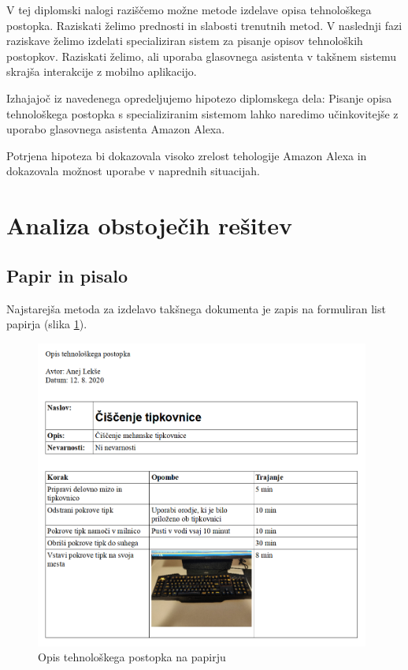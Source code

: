 \documentclass[a4paper, 12pt]{book}
\begin{document}
V tej diplomski nalogi raziščemo možne metode izdelave opisa tehnološkega postopka.
Raziskati želimo prednosti in slabosti trenutnih metod.
V naslednji fazi raziskave želimo izdelati specializiran sistem za pisanje opisov tehnoloških postopkov.
Raziskati želimo, ali uporaba glasovnega asistenta v takšnem sistemu skrajša interakcije z mobilno aplikacijo.

Izhajajoč iz navedenega opredeljujemo hipotezo diplomskega dela: Pisanje opisa tehnološkega postopka s specializiranim sistemom lahko naredimo učinkovitejše z uporabo glasovnega asistenta Amazon Alexa.

Potrjena hipoteza bi dokazovala visoko zrelost tehologije Amazon Alexa in dokazovala možnost uporabe v naprednih situacijah.

\section{Analiza obstoječih rešitev}

\subsection{Papir in pisalo}

Najstarejša metoda za izdelavo takšnega dokumenta je zapis na formuliran list papirja (slika \ref{paper}).

\begin{figure}[H]
\begin{center}
\includegraphics[width=11cm]{report_paper}
\end{center}
\caption{Opis tehnološkega postopka na papirju}
\label{paper}
\end{figure}
\end{document}
